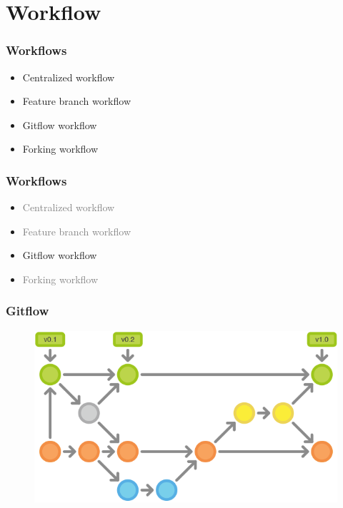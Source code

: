\documentclass{beamer}
\begin{document}
\section{Workflow}

\begin{frame}
    \frametitle{Workflows}
    \begin{itemize}
        \item Centralized workflow
        \item Feature branch workflow
        \item Gitflow workflow
        \item Forking workflow
    \end{itemize}
\end{frame}

\begin{frame}
    \frametitle{Workflows}
    \begin{itemize}
        \item \textcolor{gray}{Centralized workflow}
        \item \textcolor{gray}{Feature branch workflow}
        \item Gitflow workflow
        \item \textcolor{gray}{Forking workflow}
    \end{itemize}
\end{frame}

\begin{frame}
    \frametitle{Gitflow}
    \begin{figure}[h!]
        \begin{center}
            \includegraphics[scale=0.5]{gitflow1.png}
        \end{center}
    \end{figure}
\end{frame}
\end{document}
